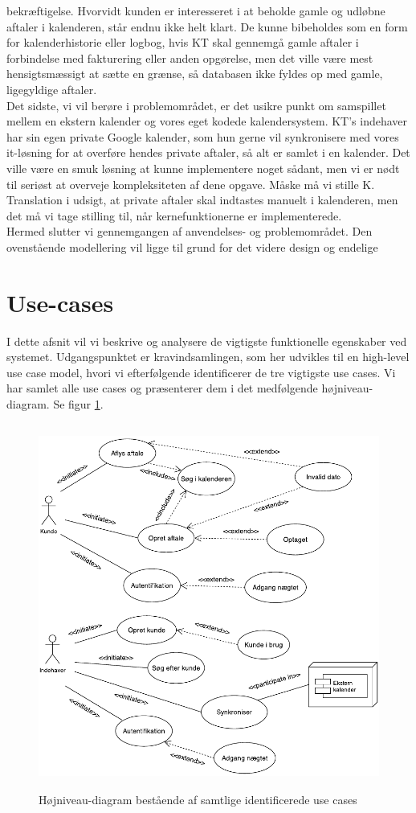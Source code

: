 \documentclass[12pt]{article}   %
\begin{document}
bekræftigelse. Hvorvidt kunden er interesseret i at beholde gamle og udløbne aftaler 
i kalenderen, står endnu ikke helt klart. De kunne bibeholdes som en form for
kalenderhistorie eller logbog, hvis KT skal gennemgå gamle aftaler i
forbindelse med fakturering eller anden opgørelse, men det ville være mest
hensigtsmæssigt at sætte en grænse, så databasen ikke fyldes op med gamle,
ligegyldige aftaler.\\ 
Det sidste, vi vil berøre i problemområdet, er det usikre punkt om samspillet
mellem en ekstern kalender og vores eget kodede kalendersystem. KT's indehaver
har sin egen private Google kalender, som hun gerne vil synkronisere med vores
it-løsning for at overføre hendes private aftaler, så alt er samlet i en
kalender. Det ville være en smuk løsning at kunne implementere noget sådant,
men vi er nødt til seriøst at overveje kompleksiteten af dene opgave. Måske må
vi stille K. Translation i udsigt, at private aftaler skal indtastes manuelt i
kalenderen, men det må vi tage stilling til, når kernefunktionerne er
implementerede. \\
Hermed slutter vi gennemgangen af anvendelses- og problemområdet. Den
ovenstående modellering vil ligge til grund for det videre design og endelige


\section{Use-cases}
I dette afsnit vil vi beskrive og analysere de vigtigste funktionelle
egenskaber ved systemet. Udgangspunktet er kravindsamlingen, som her udvikles
til en high-level use case model, hvori vi efterfølgende identificerer de tre
vigtigste use cases. Vi har samlet alle use cases og præsenterer dem i det
medfølgende højniveau-diagram. Se figur \ref{fig:use}.

\begin{center}
\begin{figure}[!ht]
\includegraphics[width=12cm, height=12cm]{highlevel.pdf}
\caption{Højniveau-diagram bestående af samtlige identificerede use cases}
\label{fig:use}
\end{figure}
\end{center}
\end{document}
